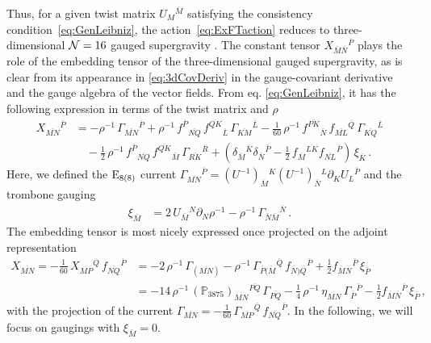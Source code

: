 \documentclass[a4paper, 11pt]{article}
\numberwithin{equation}{section}
\newcommand{\ov}[1]{\overline{#1}}
\newcommand{\+}{\oplus}
\newcommand{\UI}{\left(U^{-1}\right)}
\newcommand{\fl}[1]{\ov{#1}}
\begin{document}
Thus, for a given twist matrix $U_{M}{}^{\fl{M}}$ satisfying the consistency condition~\eqref{eq:GenLeibniz}, the action~\eqref{eq:ExFTaction} reduces to three-dimensional ${\cal N}=16$ gauged supergravity \cite{Nicolai:2000sc,Nicolai:2001sv}. The constant tensor $X_{\fl{M}\fl{N}}{}^{\fl{P}}$ plays the role of the embedding tensor of the three-dimensional gauged supergravity, as is clear from its appearance in \eqref{eq:3dCovDeriv} in the gauge-covariant derivative and the gauge algebra of the vector fields. From eq. \eqref{eq:GenLeibniz}, it has the following expression in terms of the twist matrix and $\rho$
\begin{equation}
	\begin{split}
		X_{\fl{MN}}{}^{\fl{P}}&=-\rho^{-1}\,\Gamma_{\fl{MN}}{}^{\fl{P}} + \rho^{-1}\,f^{\fl{P}}{}_{\fl{NQ}}\,f^{\fl{QK}}{}_{\fl{L}}\,\Gamma_{\fl{KM}}{}^{\fl{L}}-\frac{1}{60}\,\rho^{-1}\,f^{\fl{PK}}{}_{\fl{N}}\,f_{\fl{ML}}{}^{\fl{Q}}\,\Gamma_{\fl{KQ}}{}^{\fl{L}}\\
		&\quad-\frac{1}{2}\,\rho^{-1}\,f^{\fl{P}}{}_{\fl{NQ}}\,f^{\fl{QK}}{}_{\fl{M}}\,\Gamma_{\fl{RK}}{}^{\fl{R}}+\left(\delta_{\fl{M}}{}^{\fl{K}}\delta_{\fl{N}}{}^{\fl{P}}-\frac{1}{2}\,f_{\fl{M}}{}^{\fl{LK}}f_{\fl{NL}}{}^{\fl{P}}\right)\,\xi_{\fl{K}}\,.
	\end{split}
\end{equation}
Here, we defined the ${\rm E}_{8(8)}$ current $\Gamma_{\fl{MN}}{}^{\fl{P}}=\UI_{\fl{M}}{}^{K}\UI_{\fl{N}}{}^{L}\partial_{K}U_{L}{}^{\fl{P}}$ and the trombone gauging
\begin{equation} \label{eq:Trombone}
	\begin{split}
		\xi_{\fl{M}} %
		&= 2\,U_{\fl{M}}{}^{N}\partial_{N}\rho^{-1} - \rho^{-1}\, \Gamma_{\ov{N}\ov{M}}{}^{\ov{N}} \,.
	\end{split}
\end{equation}
The embedding tensor is most nicely expressed once projected on the adjoint representation
\begin{equation} \label{eq:symembeddingtensor}
	\begin{split}
		X_{\fl{MN}} = -\frac{1}{60}\,X_{\fl{MP}}{}^{\fl{Q}}\,f_{\fl{NQ}}{}^{\fl{P}} &= - 2\,\rho^{-1}\,\Gamma_{(\fl{MN})} - \rho^{-1}\,\Gamma_{\fl{P}(\fl{M}}{}^{\fl{Q}}\,f_{\fl{N})\fl{Q}}{}^{\fl{P}} + \frac12 f_{\ov{M}\ov{N}}{}^{\ov{P}}\, \xi_{\ov{P}} \\
		&= - 14\,\rho^{-1}\,(\mathbb{P}_{3875})_{\fl{MN}}{}^{\fl{PQ}}\,\Gamma_{\fl{PQ}} - \frac{1}{4}\,\rho^{-1}\,\eta_{\fl{MN}}\,\Gamma_{\fl{P}}{}^{\fl{P}} - \frac12 f_{\ov{M}\ov{N}}{}^{\ov{P}}\, \xi_{\ov{P}} \,,
	\end{split}
\end{equation}
with the projection of the current $\Gamma_{\fl{MN}} = - \tfrac{1}{60}\,\Gamma_{\fl{MP}}{}^{\fl{Q}}\,f_{\fl{NQ}}{}^{\fl{P}}$. In the following, we will focus on gaugings with $\xi_{\fl{M}}=0$.
\end{document}

